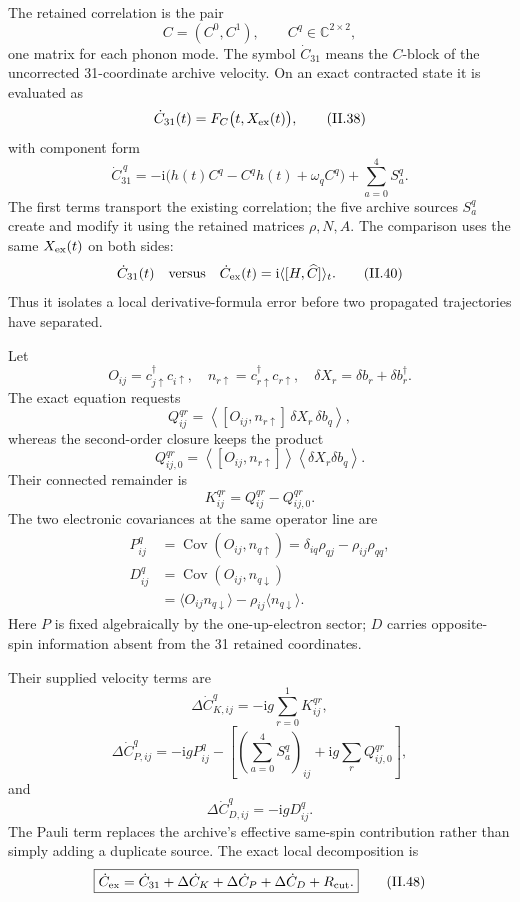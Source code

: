 \documentclass[10pt,letterpaper,twocolumn]{article}
\newcommand{\C}{\mathbb C}
\newcommand{\ii}{\mathrm i}
\begin{document}
The retained correlation is the pair
\[
C=(C^0,C^1),
\qquad C^q\in\C^{2\times2},
\tag{II.37}
\]
one matrix for each phonon mode.  The symbol \(\dot C_{31}\) means the
\(C\)-block of the uncorrected 31-coordinate archive velocity.  On an exact
contracted state it is evaluated as
\[
\dot C_{31}(t)=F_C\bigl(t,X_{\rm ex}(t)\bigr),
\tag{II.38}
\]
with component form
\[
\dot C_{31}^{\,q}
=-\ii\bigl(h(t)C^q-C^qh(t)+\omega_qC^q\bigr)
+\sum_{a=0}^{4}S_a^q.
\tag{II.39}
\]
The first terms transport the existing correlation; the five archive sources
\(S_a^q\) create and modify it using the retained matrices \(\rho,N,A\).
The comparison uses the same \(X_{\rm ex}(t)\) on both sides:
\[
\dot C_{31}(t)
\quad\hbox{versus}\quad
\dot C_{\rm ex}(t)=\ii\langle[H,\widehat C]\rangle_t.
\tag{II.40}
\]
Thus it isolates a local derivative-formula error before two propagated
trajectories have separated.

Let
\[
O_{ij}=c_{j\uparrow}^\dagger c_{i\uparrow},
\quad n_{r\uparrow}=c_{r\uparrow}^\dagger c_{r\uparrow},
\quad \delta X_r=\delta b_r+\delta b_r^\dagger.
\]
The exact equation requests
\[
Q^{qr}_{ij}
=\left\langle[O_{ij},n_{r\uparrow}]\,\delta X_r\,\delta b_q\right\rangle,
\tag{II.41}
\]
whereas the second-order closure keeps the product
\[
Q^{qr}_{ij,0}
=\left\langle[O_{ij},n_{r\uparrow}]\right\rangle
 \left\langle\delta X_r\delta b_q\right\rangle.
\tag{II.42}
\]
Their connected remainder is
\[
K^{qr}_{ij}=Q^{qr}_{ij}-Q^{qr}_{ij,0}.
\tag{II.43}
\]
The two electronic covariances at the same operator line are
{\footnotesize
\[
\begin{aligned}
P^q_{ij}
&=\operatorname{Cov}(O_{ij},n_{q\uparrow})
=\delta_{iq}\rho_{qj}-\rho_{ij}\rho_{qq},\\
D^q_{ij}
&=\operatorname{Cov}(O_{ij},n_{q\downarrow})\\
&=\langle O_{ij}n_{q\downarrow}\rangle
-\rho_{ij}\langle n_{q\downarrow}\rangle.
\end{aligned}
\tag{II.44}
\]
}
Here \(P\) is fixed algebraically by the one-up-electron sector; \(D\) carries
opposite-spin information absent from the 31 retained coordinates.

Their supplied velocity terms are
\[
\boxed{
\Delta\dot C^q_{K,ij}
=-\ii g\sum_{r=0}^{1}K^{qr}_{ij},}
\tag{II.45}
\]
{\footnotesize
\[
\boxed{
\Delta\dot C^q_{P,ij}
=-\ii gP^q_{ij}
-\left[
\left(\sum_{a=0}^{4}S_a^q\right)_{ij}
+\ii g\sum_rQ^{qr}_{ij,0}
\right],}
\tag{II.46}
\]
}
and
\[
\boxed{\Delta\dot C^q_{D,ij}=-\ii gD^q_{ij}.}
\tag{II.47}
\]
The Pauli term replaces the archive's effective same-spin contribution rather
than simply adding a duplicate source.  The exact local decomposition is
\[
\boxed{
\dot C_{\rm ex}
=\dot C_{31}
+\Delta\dot C_K
+\Delta\dot C_P
+\Delta\dot C_D
+R_{\rm cut}.}
\tag{II.48}
\]
\end{document}
